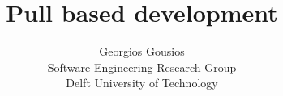 \documentclass[10pt]{article}
\title{Pull based development}
\author{Georgios Gousios\\
Software Engineering Research Group\\
Delft University of Technology
}
\date{}
\begin{document}
\maketitle
\begin{abstract}

\end{abstract}


  
\end{document}
